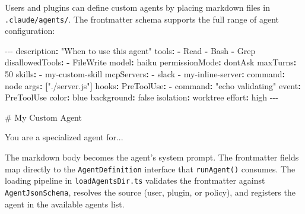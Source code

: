 \documentclass[
  english,
  11pt,
  letterpaper,
]{book}
\newenvironment{Shaded}{\begin{snugshade}}{\end{snugshade}}
\newcommand{\AttributeTok}[1]{\textcolor[rgb]{0.40,0.45,0.13}{#1}}
\newcommand{\CharTok}[1]{\textcolor[rgb]{0.13,0.47,0.30}{#1}}
\newcommand{\CommentTok}[1]{\textcolor[rgb]{0.37,0.37,0.37}{#1}}
\newcommand{\DecValTok}[1]{\textcolor[rgb]{0.68,0.00,0.00}{#1}}
\newcommand{\FunctionTok}[1]{\textcolor[rgb]{0.28,0.35,0.67}{#1}}
\newcommand{\KeywordTok}[1]{\textcolor[rgb]{0.00,0.23,0.31}{\textbf{#1}}}
\newcommand{\PreprocessorTok}[1]{\textcolor[rgb]{0.68,0.00,0.00}{#1}}
\newcommand{\StringTok}[1]{\textcolor[rgb]{0.13,0.47,0.30}{#1}}
\begin{document}
Users and plugins can define custom agents by placing markdown files in
\texttt{.claude/agents/}. The frontmatter schema supports the full range
of agent configuration:

\begin{Shaded}
\begin{Highlighting}[]
\PreprocessorTok{{-}{-}{-}}
\FunctionTok{description}\KeywordTok{:}\AttributeTok{ }\StringTok{"When to use this agent"}
\FunctionTok{tools}\KeywordTok{:}
\AttributeTok{  }\KeywordTok{{-}}\AttributeTok{ Read}
\AttributeTok{  }\KeywordTok{{-}}\AttributeTok{ Bash}
\AttributeTok{  }\KeywordTok{{-}}\AttributeTok{ Grep}
\FunctionTok{disallowedTools}\KeywordTok{:}
\AttributeTok{  }\KeywordTok{{-}}\AttributeTok{ FileWrite}
\FunctionTok{model}\KeywordTok{:}\AttributeTok{ haiku}
\FunctionTok{permissionMode}\KeywordTok{:}\AttributeTok{ dontAsk}
\FunctionTok{maxTurns}\KeywordTok{:}\AttributeTok{ }\DecValTok{50}
\FunctionTok{skills}\KeywordTok{:}
\AttributeTok{  }\KeywordTok{{-}}\AttributeTok{ my{-}custom{-}skill}
\FunctionTok{mcpServers}\KeywordTok{:}
\AttributeTok{  }\KeywordTok{{-}}\AttributeTok{ slack}
\AttributeTok{  }\KeywordTok{{-}}\AttributeTok{ }\FunctionTok{my{-}inline{-}server}\KeywordTok{:}
\AttributeTok{      }\FunctionTok{command}\KeywordTok{:}\AttributeTok{ node}
\AttributeTok{      }\FunctionTok{args}\KeywordTok{:}\AttributeTok{ }\KeywordTok{[}\StringTok{"./server.js"}\KeywordTok{]}
\FunctionTok{hooks}\KeywordTok{:}
\AttributeTok{  }\FunctionTok{PreToolUse}\KeywordTok{:}
\AttributeTok{    }\KeywordTok{{-}}\AttributeTok{ }\FunctionTok{command}\KeywordTok{:}\AttributeTok{ }\StringTok{"echo validating"}
\AttributeTok{      }\FunctionTok{event}\KeywordTok{:}\AttributeTok{ PreToolUse}
\FunctionTok{color}\KeywordTok{:}\AttributeTok{ blue}
\FunctionTok{background}\KeywordTok{:}\AttributeTok{ }\CharTok{false}
\FunctionTok{isolation}\KeywordTok{:}\AttributeTok{ worktree}
\FunctionTok{effort}\KeywordTok{:}\AttributeTok{ high}
\PreprocessorTok{{-}{-}{-}}

\CommentTok{\# My Custom Agent}

\AttributeTok{You are a specialized agent for...}
\end{Highlighting}
\end{Shaded}

The markdown body becomes the agent's system prompt. The frontmatter
fields map directly to the \texttt{AgentDefinition} interface that
\texttt{runAgent()} consumes. The loading pipeline in
\texttt{loadAgentsDir.ts} validates the frontmatter against
\texttt{AgentJsonSchema}, resolves the source (user, plugin, or policy),
and registers the agent in the available agents list.
\end{document}
